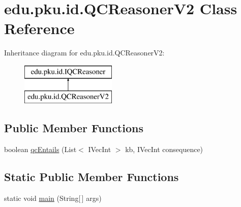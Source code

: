 \hypertarget{classedu_1_1pku_1_1id_1_1_q_c_reasoner_v2}{
\section{edu.pku.id.QCReasonerV2 Class Reference}
\label{classedu_1_1pku_1_1id_1_1_q_c_reasoner_v2}
}
Inheritance diagram for edu.pku.id.QCReasonerV2:\begin{figure}[H]
\begin{center}
\leavevmode
\includegraphics[height=2.000000cm]{classedu_1_1pku_1_1id_1_1_q_c_reasoner_v2}
\end{center}
\end{figure}
\subsection*{Public Member Functions}
\begin{DoxyCompactItemize}
\item 
boolean \hyperlink{classedu_1_1pku_1_1id_1_1_q_c_reasoner_v2_a04f22e9cef82ae44d46179d252ad46ef}{qcEntails} (List$<$ IVecInt $>$ kb, IVecInt consequence)
\end{DoxyCompactItemize}
\subsection*{Static Public Member Functions}
\begin{DoxyCompactItemize}
\item 
static void \hyperlink{classedu_1_1pku_1_1id_1_1_q_c_reasoner_v2_aa807c5199d238766a245fdc389369808}{main} (String\mbox{[}$\,$\mbox{]} args)
\end{DoxyCompactItemize}
